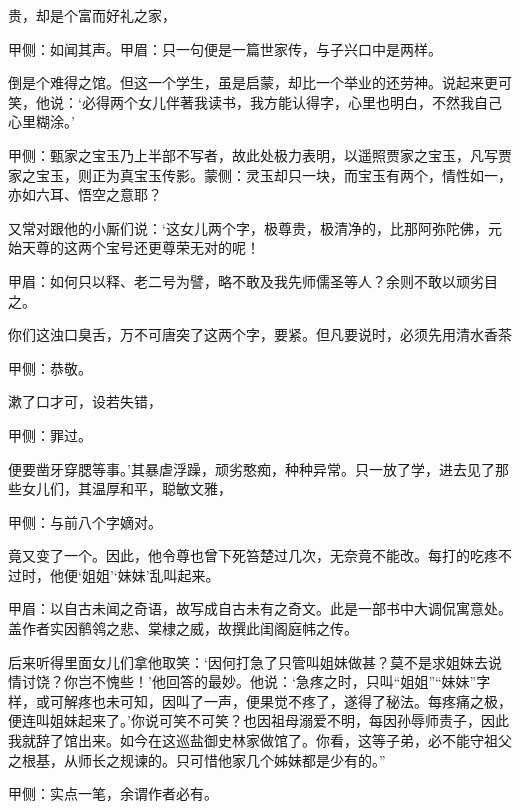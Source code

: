 \begin{parag}
贵，却是个富而好礼之家，\begin{note}甲侧：如闻其声。甲眉：只一句便是一篇世家传，与子兴口中是两样。\end{note}倒是个难得之馆。但这一个学生，虽是启蒙，却比一个举业的还劳神。说起来更可笑，他说：‘必得两个女儿伴著我读书，我方能认得字，心里也明白，不然我自己心里糊涂。’\begin{note}甲侧：甄家之宝玉乃上半部不写者，故此处极力表明，以遥照贾家之宝玉，凡写贾家之宝玉，则正为真宝玉传影。蒙侧：灵玉却只一块，而宝玉有两个，情性如一，亦如六耳、悟空之意耶？\end{note}又常对跟他的小厮们说：‘这女儿两个字，极尊贵，极清净的，比那阿弥陀佛，元始天尊的这两个宝号还更尊荣无对的呢！\begin{note}甲眉：如何只以释、老二号为譬，略不敢及我先师儒圣等人？余则不敢以顽劣目之。\end{note}你们这浊口臭舌，万不可唐突了这两个字，要紧。但凡要说时，必须先用清水香茶\begin{note}甲侧：恭敬。\end{note}漱了口才可，设若失错，\begin{note}甲侧：罪过。\end{note}便要凿牙穿腮等事。’其暴虐浮躁，顽劣憨痴，种种异常。只一放了学，进去见了那些女儿们，其温厚和平，聪敏文雅，\begin{note}甲侧：与前八个字嫡对。\end{note}竟又变了一个。因此，他令尊也曾下死笞楚过几次，无奈竟不能改。每打的吃疼不过时，他便‘姐姐’‘妹妹’乱叫起来。\begin{note}甲眉：以自古未闻之奇语，故写成自古未有之奇文。此是一部书中大调侃寓意处。盖作者实因鹡鸰之悲、棠棣之威，故撰此闺阁庭帏之传。\end{note}后来听得里面女儿们拿他取笑：‘因何打急了只管叫姐妹做甚？莫不是求姐妹去说情讨饶？你岂不愧些！’他回答的最妙。他说：‘急疼之时，只叫“姐姐”“妹妹”字样，或可解疼也未可知，因叫了一声，便果觉不疼了，遂得了秘法。每疼痛之极，便连叫姐妹起来了。’你说可笑不可笑？也因祖母溺爱不明，每因孙辱师责子，因此我就辞了馆出来。如今在这巡盐御史林家做馆了。你看，这等子弟，必不能守祖父之根基，从师长之规谏的。只可惜他家几个姊妹都是少有的。”\begin{note}甲侧：实点一笔，余谓作者必有。\end{note}
\end{parag}


